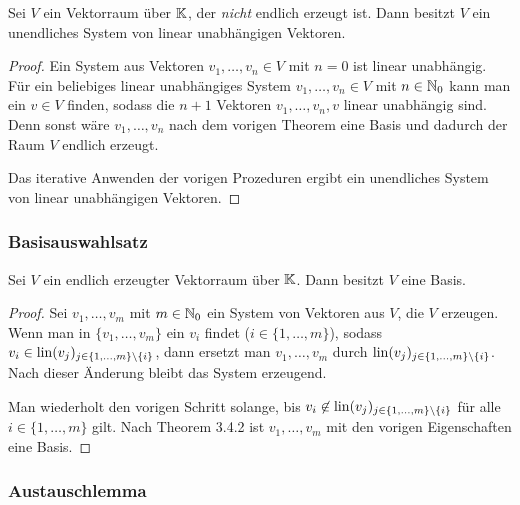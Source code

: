 \begin{klr}
	Sei $ V $ ein Vektorraum über $ \mathbb K $, der \emph{nicht} endlich erzeugt ist. Dann besitzt $ V $ ein unendliches System von linear unabhängigen Vektoren.
\end{klr}
\begin{proof}
	Ein System aus Vektoren $ v_1, \ldots, v_n \in V $ mit $ n = 0 $ ist linear unabhängig. Für ein beliebiges linear unabhängiges System $ v_1, \ldots, v_n \in V $ mit $ n \in \mathbb N_0 $ kann man ein $ v \in V $ finden, sodass die $ n+1 $ Vektoren $ v_1, \ldots, v_n, v $ linear unabhängig sind. Denn sonst wäre $ v_1, \ldots, v_n $ nach dem vorigen Theorem eine Basis und dadurch der Raum $ V $ endlich erzeugt.
	
	Das iterative Anwenden der vorigen Prozeduren ergibt ein unendliches System von linear unabhängigen Vektoren.
\end{proof}

\subsubsection{Basisauswahlsatz}

\begin{thm}
	Sei $ V $ ein endlich erzeugter Vektorraum über $ \mathbb K $. Dann besitzt $ V $ eine Basis.
\end{thm}
\begin{proof}
	Sei $ v_1, \ldots, v_m $ mit $ m \in \mathbb N_0 $ ein System von Vektoren aus $ V $, die $ V $ erzeugen. Wenn man in $ \{ v_1, \ldots, v_m \} $ ein $ v_i $ findet ($ i \in \{ 1, \ldots, m \} $), sodass $ v_i \in \operatorname{lin}(v_j)_{j \in \{ 1, \ldots, m \}\setminus\{ i \}} $, dann ersetzt man $ v_1, \ldots, v_m $ durch $ \operatorname{lin}(v_j)_{j \in \{ 1, \ldots, m \}\setminus\{ i \}} $. Nach dieser Änderung bleibt das System erzeugend.
	
	Man wiederholt den vorigen Schritt solange, bis $ v_i \not\in \operatorname{lin}(v_j)_{j \in \{ 1, \ldots, m \}\setminus\{ i \}} $ für alle $ i \in \{ 1, \ldots, m \} $ gilt. Nach Theorem 3.4.2 ist $ v_1, \ldots, v_m $ mit den vorigen Eigenschaften eine Basis.
\end{proof}

\subsubsection{Austauschlemma}

